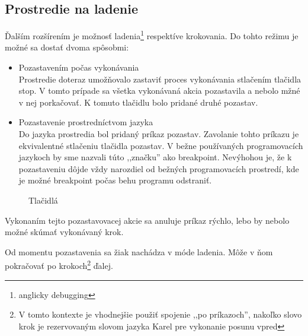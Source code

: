 
\subsection{Prostredie na ladenie}

Ďalším rozšírením je možnosť ladenia\footnote{anglicky debugging} respektíve krokovania.
Do tohto režimu je možné sa dostať dvoma spôsobmi:
\begin{itemize}
    \item Pozastavením počas vykonávania \\
Prostredie doteraz umožňovalo zastaviť proces vykonávania stlačením tlačidla stop.
V tomto prípade sa všetka vykonávaná akcia pozastavila a nebolo mžné v nej porkačovať.
K tomuto tlačidlu bolo pridané druhé pozastav. 
    \item Pozastavenie prostredníctvom jazyka \\
Do jazyka prostredia bol pridaný príkaz pozastav. 
Zavolanie tohto príkazu je ekvivalentné stlačeniu tlačidla pozastav.
V bežne používaných programovacích jazykoch by sme nazvali túto ,,značku'' ako breakpoint.
Nevýhohou je, že k pozastaveniu dôjde vždy narozdiel od bežných programovacích prostredí, kde je možné breakpoint počas behu programu odstraniť.
\end{itemize}

\begin{figure}[ht]
\centering
{}
\caption{Tlačidlá}
\end{figure}

Vykonaním tejto pozastavovacej akcie sa anuluje príkaz rýchlo, lebo by nebolo možné skúmať vykonávaný krok. 

Od momentu pozastavenia sa žiak nachádza v móde ladenia.
Môže v ňom pokračovať po krokoch\footnote{V tomto kontexte je vhodnejšie použiť spojenie ,,po príkazoch'', nakoľko slovo krok je rezervovaným slovom jazyka Karel pre vykonanie posunu vpred} ďalej.


